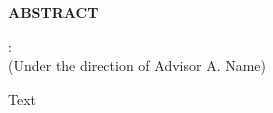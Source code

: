 %
%
%

\begin{center}
\vspace*{1in} %
{\normalfont\textbf{ABSTRACT}}
\vspace{1em}

\begin{singlespace}
\MakeUppercase{\docAuthorFull}: \docTitle\\
(Under the direction of Advisor A. Name)
\end{singlespace}
\end{center}

Text

\clearpage
